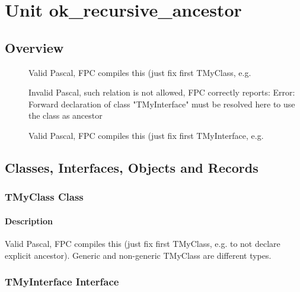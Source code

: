 \documentclass{report}
\begin{document}
\newlength{\tmplength}
\chapter{Unit ok{\_}recursive{\_}ancestor}
\section{Overview}
\begin{description}
\item[\texttt{\begin{ttfamily}TMyClass\end{ttfamily} Class}]
\item[\texttt{\begin{ttfamily}TMyClass\end{ttfamily} Class}]Valid Pascal, FPC compiles this (just fix first TMyClass, e.g.
\item[\texttt{\begin{ttfamily}TMyInterface\end{ttfamily} Interface}]Invalid Pascal, such relation is not allowed, FPC correctly reports: Error: Forward declaration of class "TMyInterface" must be resolved here to use the class as ancestor
\item[\texttt{\begin{ttfamily}TMyInterface\end{ttfamily} Interface}]Valid Pascal, FPC compiles this (just fix first TMyInterface, e.g.
\end{description}
\section{Classes, Interfaces, Objects and Records}
\subsection*{TMyClass Class}
\subsubsection*{\large{\textbf{Description}}\normalsize\hspace{1ex}\hfill}
Valid Pascal, FPC compiles this (just fix first TMyClass, e.g. to not declare explicit ancestor). Generic and non{-}generic TMyClass are different types.\subsection*{TMyInterface Interface}
\end{document}
